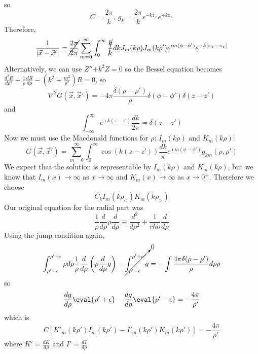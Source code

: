 \documentclass[a4paper,twoside,master.tex]{subfiles}
\begin{document}
so
\begin{equation}
    C = \frac{2\pi}{k},\ g_k= \frac{2\pi}{k}e^{-kz_>}e^{+kz_<}
\end{equation}
Therefore,
\begin{equation}
    \frac{1}{|\vec{x}-\vec{x}'|} = \cancel{\frac{2\pi}{2\pi}}\sum_{m=0}^\infty \int_0^\infty \cancel{\frac{k}{k}}dk J_m(k\rho) J_m(k\rho') e^{\imath m(\phi-\phi')}e^{-k[z_> - z_<]}
\end{equation}
Alternatively, we can use $Z''\bm{+}k^2Z = 0$ so the Bessel equation becomes $\frac{d^2 R}{d\rho^2}+\frac{1}{\rho} \frac{dR}{d\rho} - \left(k^2 + \frac{m^2}{\rho^2}\right)R = 0$, so
\begin{equation}
    \nabla^2 G(\vec{x},\vec{x}') = -4\pi \frac{\delta(\rho-\rho')}{\rho} \delta(\phi-\phi') \delta(z-z')
\end{equation}
and
\begin{equation}
    \int_{-\infty}^{\infty} e^{\imath k(z-z')} \frac{dk}{2\pi} = \delta(z-z')
\end{equation}
Now we must use the Macdonald functions for $\rho$: $I_m(k\rho)$ and $K_m(k\rho)$:
\begin{equation}
    G(\vec{x},\vec{x}') = \sum_{m=0}^\infty \int_{0}^{\infty} \cos(k(z-z')) \frac{dk}{\pi} e^{\imath m(\phi-\phi')} g_{km}(\rho,\rho')
\end{equation}
We expect that the solution is representable by $I_m(k\rho)$ and $K_m(k\rho)$, but we know that $I_m(x)\to\infty$ as $x\to\infty$ and $K_m(x)\to\infty$ as $x\to 0^+$. Therefore we choose
\begin{equation}
    C_k I_m(k\rho_<) K_m(k\rho_>)
\end{equation}
Our original equation for the radial part was
\begin{equation}
    \frac{1}{\rho}\frac{d}{d\rho}\rho \frac{d}{d\rho} \equiv \frac{d^2}{d\rho^2} + \frac{1}{rho}\frac{d}{d\rho}
\end{equation}
Using the jump condition again,
\begin{equation}
    \int_{\rho'-\epsilon}^{\rho'+\epsilon}\rho d\rho \frac{1}{\rho} \frac{d}{d\rho}\left( \rho \frac{d}{d\rho} g \right) - \cancelto{0}{\int_{\rho'-\epsilon}^{\rho'+\epsilon} g} = -\int \frac{4\pi\delta(\rho-\rho')}{\rho} d\rho \rho
\end{equation}
so
\begin{equation}
    \frac{dg}{d\rho}\eval{\rho'+\epsilon} - \frac{dg}{d\rho}\eval{\rho'-\epsilon} = -\frac{4\pi}{\rho'}
\end{equation}
which is
\begin{equation}
    C[K'_m(k\rho') I_m(k\rho') - I'_m(k\rho')K_m(k\rho')] = -\frac{4\pi}{\rho'}
\end{equation}
where $K' = \frac{dK}{d\rho}$ and $I' = \frac{dI}{d\rho}$
\end{document}
